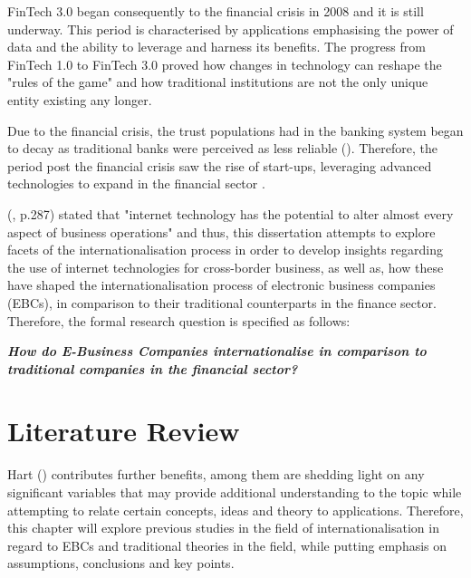\documentclass[11pt,a4paper]{article}
\begin{document}
FinTech 3.0 began consequently to the financial crisis in 2008 and it is still underway. This period is characterised by applications emphasising the power of data and the ability to leverage and harness its benefits. The progress from FinTech 1.0 to FinTech 3.0 proved how changes in technology can reshape the "rules of the game" and how traditional institutions are not the only unique entity existing any longer. \par
Due to the financial crisis, the trust populations had in the banking system began to decay as traditional banks were perceived as less reliable (\cite{andrewConfidenceBanksLow2015}). Therefore, the period post the financial crisis saw the rise of start-ups, leveraging advanced technologies to expand in the financial sector \parencite{arner150YearsFintech2016}.  \par
\citeauthor{parasuramanMarketingServingCustomers2002} (\citeyear{parasuramanMarketingServingCustomers2002}, p.287) stated that "internet technology has the potential to alter almost every aspect of business operations"  and thus, this dissertation attempts to explore facets of the internationalisation process in order to  develop insights regarding the use of internet technologies for cross-border business, as well as, how these have shaped the internationalisation process of electronic business companies (EBCs), in comparison to their traditional counterparts in the finance sector.  Therefore, the formal research question is specified as follows:

\begin{center}
\textbf{\textit{How do E-Business Companies internationalise in comparison to traditional companies in the financial sector?}}
\end{center}
 
\newpage

\section{Literature Review}
\label{lit_review}
  \vspace{-1mm}
\par 
Hart (\citeyear{hartDoingLiteratureReview1998}) contributes further benefits, among them are shedding light on any significant variables that may provide additional understanding to the topic while attempting to relate certain concepts, ideas and theory to applications. Therefore, this chapter will explore previous studies in the field of internationalisation in regard to EBCs and traditional theories in the field, while putting emphasis on assumptions, conclusions and key points.
\end{document}
